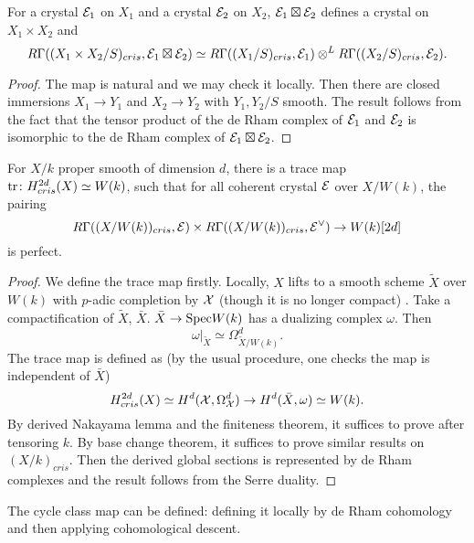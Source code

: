 \begin{theorem}
    For a crystal ${\mathcal {E}}_1$ on $X_1$ and a crystal ${\mathcal {E}}_2$ on $X_2$, 
    ${\mathcal {E}}_1 \boxtimes {\mathcal {E}}_2$ defines a crystal on $X_1\times X_2$ and 
    \[
        R \Gamma ((X_1\times X_2/S)_{cris}, {\mathcal {E}}_1 \boxtimes {\mathcal {E}}_2) \simeq 
        R \Gamma((X_1/S)_{cris}, {\mathcal {E}}_1) \otimes^{L} R \Gamma ((X_2/S)_{cris}, {\mathcal {E}}_2).
    \]
\end{theorem}
\begin{proof}
    The map is natural and we may check it locally. 
    Then there are closed immersions $X_1\to Y_1$ 
    and $X_2\to Y_2$ with $Y_1,Y_2/S$ smooth. 
    The result follows from the fact that 
    the tensor product of the de Rham complex of ${\mathcal {E}}_1$ and ${\mathcal {E}}_2$ 
    is isomorphic to the de Rham complex of ${\mathcal {E}}_1\boxtimes {\mathcal {E}}_2$.
\end{proof}
\begin{theorem}
    For $X/k$ proper smooth of dimension $d$, 
    there is a trace map $\operatorname{tr}\colon H^{2d}_{cris}(X)\simeq W(k)$, 
    such that for all coherent crystal ${\mathcal {E}}$ over $X/W(k)$, the pairing
    \[
        R\Gamma((X/W(k))_{cris}, {\mathcal {E}}) \times 
        R \Gamma((X/W(k))_{cris}, {\mathcal {E}}^\vee) \to W(k)[2d]
    \]
    is perfect.
\end{theorem}
\begin{proof}
    We define the trace map firstly. 
    Locally, $X$ lifts to a smooth scheme $\tilde{X}$ over $W(k)$ 
    with $p$-adic completion by ${\mathcal {X}}$ (though it is no longer compact)
    . Take a compactification of $\tilde{X}$, $\bar{X}$. 
    $\bar{X} \to \mathrm{Spec} W(k)$ has a dualizing complex $\omega$. 
    Then
    \[
        \omega|_{\tilde{X}} \simeq \Omega_{\tilde{X}/W(k)}^d.
    \]
    The trace map is defined as (by the usual procedure, 
    one checks the map is independent of $\bar{X}$)
    \[
        H^{2d}_{cris}(X) \simeq 
        H^d({\mathcal {X}},\Omega_{{\mathcal {X}}}^d) \to H^d(\bar{X},\omega) \simeq W(k).
    \]
    By derived Nakayama lemma and the finiteness theorem, 
    it suffices to prove after tensoring $k$. By base change theorem, 
    it suffices to prove similar results on $(X/k)_{cris}$. 
    Then the derived global sections is represented by de Rham complexes 
    and the result follows from the Serre duality.
\end{proof}

\begin{remark}
    The cycle class map can be defined: 
    defining it locally by de Rham cohomology 
    and then applying cohomological descent.
\end{remark}

